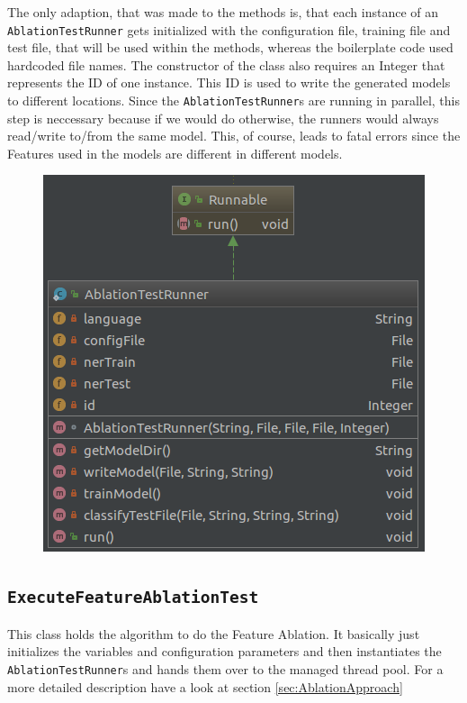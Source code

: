 \documentclass[11pt, english]{article}
\begin{document}
The only adaption, that was made to the methods is, that each instance of an \verb/AblationTestRunner/ gets initialized with the configuration file, training file and test file, that will be used within the methods, whereas the boilerplate code used hardcoded file names. The constructor of the class also requires an Integer that represents the ID of one instance. This ID is used to write the generated models to different locations. Since the \verb/AblationTestRunner/s are running in parallel, this step is neccessary because if we would do otherwise, the runners would always read/write to/from the same model. This, of course, leads to fatal errors since the Features used in the models are different in different models.


\begin{figure}
    \centering
    \includegraphics[scale=0.5]{gfx/AblationTestRunner.png}
    \label{fig:AblationTestRunner}
\end{figure}

\subsection{\texttt{ExecuteFeatureAblationTest}}
\label{sec:ExecuteFeatureAblationTest}
This class holds the algorithm to do the Feature Ablation. It basically just initializes the variables and configuration parameters and then instantiates the \verb/AblationTestRunner/s and hands them over to the managed thread pool. For a more detailed description have a look at section \ref{sec:AblationApproach}
\end{document}
